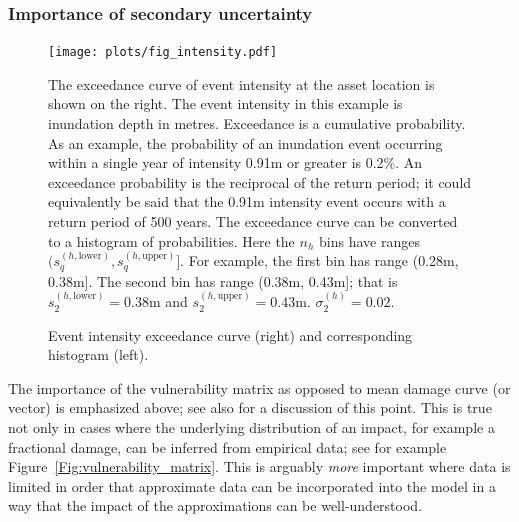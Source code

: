 \documentclass[a4paper,11pt]{extarticle} %
\begin{document}
\subsubsection{Importance of secondary uncertainty}

\begin{figure}[ht]
	
	\begin{framed}
		
		\texttt{[image: plots/fig\_intensity.pdf]}
		
	\end{framed}
	
	\footnotesize
	
	\renewcommand{\arraystretch}{1.01}
	
	\vspace{-3ex}
	
	{\justify
		The exceedance curve of event intensity at the asset location is shown on the right. The event intensity in this example is inundation depth in metres. Exceedance is a cumulative probability. As an example, the probability of an inundation event occurring within a single year of intensity 0.91m or greater is 0.2\%. An exceedance probability is the reciprocal of the return period; it could equivalently be said that the 0.91m intensity event occurs with a return period of 500 years.
		The exceedance curve can be converted to a histogram of probabilities. Here the $n_h$ bins have ranges $(s^{(h, \text{lower})}_q, s^{(h, \text{upper})}_q]$. For example, the first bin has range (0.28m, 0.38m]. The second bin has range (0.38m,    0.43m]; that is $s^{(h, \text{lower})}_2 = 0.38$m and $s^{(h, \text{upper})}_2 = 0.43$m. $\sigma^{(h)}_2 = 0.02$.
		\par}
	
	\vspace{-0.5ex}
	
	\caption{\small Event intensity exceedance curve (right) and corresponding histogram (left).}
	\label{Fig:intensity}
	
\end{figure}


The importance of the vulnerability matrix as opposed to mean damage curve (or vector) is emphasized above; see also \cite{Taylor:2015} for a discussion of this point. This is true not only in cases where the underlying distribution of an impact, for example a fractional damage, can be inferred from empirical data; see for example Figure~\ref{Fig:vulnerability_matrix}. This is arguably \emph{more} important where data is limited in order that approximate data can be incorporated into the model in a way that the impact of the approximations can be well-understood.
\end{document}
